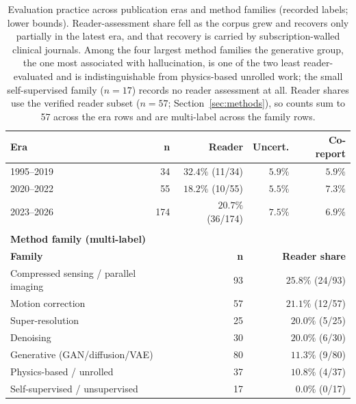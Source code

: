 \documentclass[review,authoryear]{elsarticle}
\begin{document}
\begin{table}[t]
\centering
\caption{Evaluation practice across publication eras and method families (recorded labels; lower bounds). Reader-assessment share fell as the corpus grew and recovers only partially in the latest era, and that recovery is carried by subscription-walled clinical journals. Among the four largest method families the generative group, the one most associated with hallucination, is one of the two least reader-evaluated and is indistinguishable from physics-based unrolled work; the small self-supervised family ($n=17$) records no reader assessment at all. Reader shares use the verified reader subset ($n=57$; Section~\ref{sec:methods}), so counts sum to 57 across the era rows and are multi-label across the family rows.}
\label{tab:practice_trends}
\footnotesize
\setlength{\tabcolsep}{4pt}
\renewcommand{\arraystretch}{1.12}
\begin{tabular}{l r r r r}
\hline
\textbf{Era} & \textbf{n} & \textbf{Reader} & \textbf{Uncert.} & \textbf{Co-report} \\
\hline
1995--2019 & 34 & $32.4\%$ (11/34) & $5.9\%$ & $5.9\%$ \\
2020--2022 & 55 & $18.2\%$ (10/55) & $5.5\%$ & $7.3\%$ \\
2023--2026 & 174 & $20.7\%$ (36/174) & $7.5\%$ & $6.9\%$ \\
\hline
\multicolumn{5}{c}{} \\[-6pt]
\multicolumn{5}{l}{\textbf{Method family (multi-label)}} \\
\hline
\multicolumn{2}{l}{\textbf{Family}} & \textbf{n} & \multicolumn{2}{r}{\textbf{Reader share}} \\
\hline
\multicolumn{2}{l}{Compressed sensing / parallel imaging} & 93 & \multicolumn{2}{r}{$25.8\%$ (24/93)} \\
\multicolumn{2}{l}{Motion correction} & 57 & \multicolumn{2}{r}{$21.1\%$ (12/57)} \\
\multicolumn{2}{l}{Super-resolution} & 25 & \multicolumn{2}{r}{$20.0\%$ (5/25)} \\
\multicolumn{2}{l}{Denoising} & 30 & \multicolumn{2}{r}{$20.0\%$ (6/30)} \\
\multicolumn{2}{l}{Generative (GAN/diffusion/VAE)} & 80 & \multicolumn{2}{r}{$11.3\%$ (9/80)} \\
\multicolumn{2}{l}{Physics-based / unrolled} & 37 & \multicolumn{2}{r}{$10.8\%$ (4/37)} \\
\multicolumn{2}{l}{Self-supervised / unsupervised} & 17 & \multicolumn{2}{r}{$0.0\%$ (0/17)} \\
\hline
\end{tabular}
\end{table}
\end{document}

